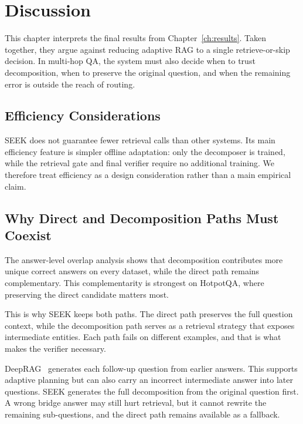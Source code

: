 
\chapter{Discussion}
\label{ch:discussion}

This chapter interprets the final results from Chapter~\ref{ch:results}. Taken together, they argue against reducing adaptive RAG to a single retrieve-or-skip decision. In multi-hop QA, the system must also decide when to trust decomposition, when to preserve the original question, and when the remaining error is outside the reach of routing.

\section{Efficiency Considerations}
\label{sec:cost-benefit}

SEEK does not guarantee fewer retrieval calls than other systems. Its main efficiency feature is simpler offline adaptation: only the decomposer is trained, while the retrieval gate and final verifier require no additional training. We therefore treat efficiency as a design consideration rather than a main empirical claim.

\section{Why Direct and Decomposition Paths Must Coexist}
\label{sec:path-complementarity}

The answer-level overlap analysis shows that decomposition contributes more unique correct answers on every dataset, while the direct path remains complementary. This complementarity is strongest on HotpotQA, where preserving the direct candidate matters most.

This is why SEEK keeps both paths. The direct path preserves the full question context, while the decomposition path serves as a retrieval strategy that exposes intermediate entities. Each path fails on different examples, and that is what makes the verifier necessary.

DeepRAG~\cite{deeprag} generates each follow-up question from earlier answers. This supports adaptive planning but can also carry an incorrect intermediate answer into later questions. SEEK generates the full decomposition from the original question first. A wrong bridge answer may still hurt retrieval, but it cannot rewrite the remaining sub-questions, and the direct path remains available as a fallback.

